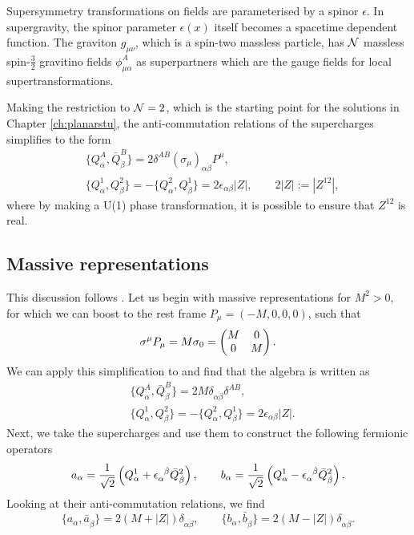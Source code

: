 Supersymmetry transformations on fields are parameterised by a spinor $\epsilon$. In supergravity, the spinor parameter $\epsilon(x)$ itself becomes a spacetime dependent function. The graviton $g_{\mu \nu}$, which is a spin-two massless particle, has ${\cal N}$ massless spin-$\tfrac{3}{2}$ gravitino fields $\phi^A_{\mu \alpha}$ as superpartners which are the gauge fields for local supertransformations.

Making the restriction to ${\cal N} = 2$, which is the starting point for the solutions in Chapter \ref{ch:planarstu}, the anti-commutation relations of the supercharges simplifies to the form
\begin{equation}
\label{eq:n2algebra}
	\begin{aligned}
	&\{ Q_\alpha^A,  \bar{Q}_{\dot{\beta}}^B \} = 2 \delta^{AB} (\sigma_\mu)_{\alpha \dot{\beta}} P^\mu, \\
	&\{ Q_\alpha^1,Q_\beta^2 \} = -\{ Q_\alpha^2,Q_\beta^1 \} = 2\epsilon_{\alpha \beta} |Z|, \qquad 2|Z| := |Z^{12}|,
	\end{aligned}
\end{equation}
where by making a U(1) phase transformation, it is possible to ensure that $Z^{12}$ is real.

\subsection*{Massive representations}

This discussion follows \cite{Mohaupt:2000gc}. Let us begin with massive representations for $M^2 > 0$, for which we can boost to the rest frame $P_\mu = (-M, 0,0,0)$, such that 
\begin{equation*}
	\sigma^\mu P_\mu = M \sigma_0 = \begin{pmatrix} M & 0 \\ 0 & M\end{pmatrix} .
\end{equation*}
We can apply this simplification to  and find that the algebra is written as
\begin{equation*}
	\begin{aligned}
	&\{ Q_\alpha^A,  \bar{Q}_{\dot{\beta}}^B \} = 2 M \delta_{\alpha \dot{\beta}} \delta^{AB} , \\
	&\{ Q_\alpha^1,Q_\beta^2 \} = -\{ Q_\alpha^2,Q_\beta^1 \} = 2\epsilon_{\alpha \beta} |Z|.
	\end{aligned}
\end{equation*}
Next, we take the supercharges and use them to construct the following fermionic operators
\begin{equation*}
	a_\alpha = \frac{1}{\sqrt{2}} \left( Q^1_\alpha + \tensor{\epsilon}{_\alpha^{\dot{\beta}}} \bar{Q}^2_{\dot{\beta}} \right), 
	\qquad
	b_\alpha = \frac{1}{\sqrt{2}} \left(Q^1_\alpha - \tensor{\epsilon}{_\alpha^{\dot{\beta}}} \bar{Q}^2_{\dot{\beta}} \right).
\end{equation*}
Looking at their anti-commutation relations, we find
\begin{equation*}
	\{a_\alpha, \bar{a}_{\dot{\beta}} \} = 2(M + |Z|) \delta_{\alpha \dot{\beta}}, \qquad \{b_\alpha, \bar{b}_{\dot{\beta}} \} = 2(M - |Z|) \delta_{\alpha \dot{\beta}}.
\end{equation*}

